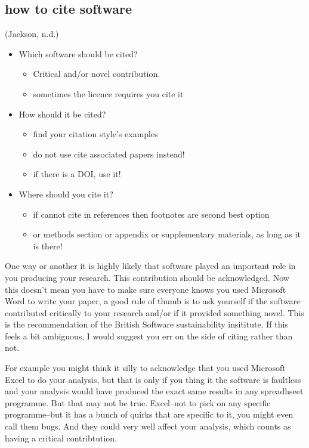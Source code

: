 \documentclass[]{article}
\providecommand{\tightlist}{%
  \setlength{\itemsep}{0pt}\setlength{\parskip}{0pt}}
\begin{document}
\hypertarget{how-to-cite-software}{%
\subsection{how to cite software}\label{how-to-cite-software}}

(Jackson, n.d.)

\begin{itemize}
\tightlist
\item
  Which software should be cited?

  \begin{itemize}
  \tightlist
  \item
    Critical and/or novel contribution.
  \item
    sometimes the licence requires you cite it
  \end{itemize}
\item
  How should it be cited?

  \begin{itemize}
  \tightlist
  \item
    find your citation style's examples
  \item
    do not use cite associated papers instead!
  \item
    if there is a DOI, use it!
  \end{itemize}
\item
  Where should you cite it?

  \begin{itemize}
  \tightlist
  \item
    if cannot cite in references then footnotes are second best option
  \item
    or methods section or appendix or supplementary materials, as long
    as it is there!
  \end{itemize}
\end{itemize}

One way or another it is highly likely that software played an important
role in you producing your research. This contribution should be
acknowledged. Now this doesn't mean you have to make sure everyone knows
you used Microsoft Word to write your paper, a good rule of thumb is to
ask yourself if the software contributed critically to your research
and/or if it provided something novel. This is the recommendation of the
British Software sustainability insititute. If this feels a bit
ambiguous, I would suggest you err on the side of citing rather than
not.

For example you might think it silly to acknowledge that you used
Microsoft Excel to do your analysis, but that is only if you thing it
the software is faultless and your analysis would have produced the
exact same results in any spreadhseet programme. But that may not be
true. Excel--not to pick on any specific programme--but it has a bunch
of quirks that are specific to it, you might even call them bugs. And
they could very well affect your analysis, which counts as having a
critical contribtution.
\end{document}
